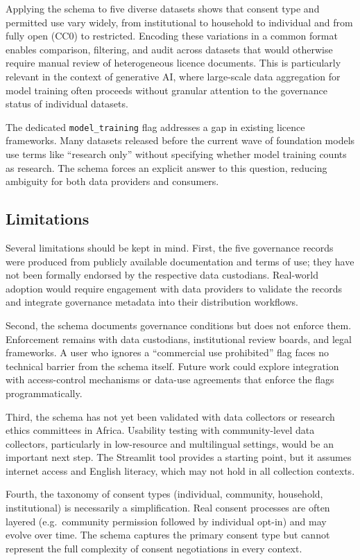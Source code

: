 \documentclass{article}
\begin{document}
Applying the schema to five diverse datasets shows that consent type and permitted use vary widely, from institutional to household to individual and from fully open (CC0) to restricted. Encoding these variations in a common format enables comparison, filtering, and audit across datasets that would otherwise require manual review of heterogeneous licence documents. This is particularly relevant in the context of generative AI, where large-scale data aggregation for model training often proceeds without granular attention to the governance status of individual datasets.

The dedicated \texttt{model\_training} flag addresses a gap in existing licence frameworks. Many datasets released before the current wave of foundation models use terms like ``research only'' without specifying whether model training counts as research. The schema forces an explicit answer to this question, reducing ambiguity for both data providers and consumers.

\subsection{Limitations}

Several limitations should be kept in mind. First, the five governance records were produced from publicly available documentation and terms of use; they have not been formally endorsed by the respective data custodians. Real-world adoption would require engagement with data providers to validate the records and integrate governance metadata into their distribution workflows.

Second, the schema documents governance conditions but does not enforce them. Enforcement remains with data custodians, institutional review boards, and legal frameworks. A user who ignores a ``commercial use prohibited'' flag faces no technical barrier from the schema itself. Future work could explore integration with access-control mechanisms or data-use agreements that enforce the flags programmatically.

Third, the schema has not yet been validated with data collectors or research ethics committees in Africa. Usability testing with community-level data collectors, particularly in low-resource and multilingual settings, would be an important next step. The Streamlit tool provides a starting point, but it assumes internet access and English literacy, which may not hold in all collection contexts.

Fourth, the taxonomy of consent types (individual, community, household, institutional) is necessarily a simplification. Real consent processes are often layered (e.g.\ community permission followed by individual opt-in) and may evolve over time. The schema captures the primary consent type but cannot represent the full complexity of consent negotiations in every context.
\end{document}
